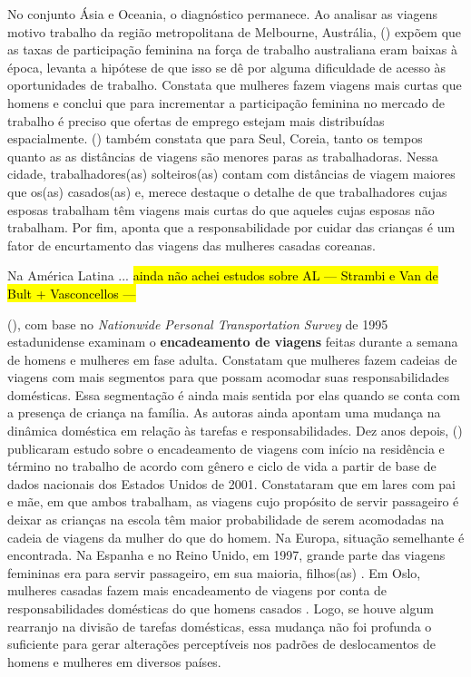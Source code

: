 No conjunto Ásia e Oceania, o diagnóstico permanece.
Ao analisar as viagens motivo trabalho da região metropolitana de Melbourne, Austrália,  (\citeyear{HOWE1982}) expõem que as taxas de participação feminina na força de trabalho australiana eram baixas à época, levanta a hipótese de que isso se dê por alguma dificuldade de acesso às oportunidades de trabalho. Constata que mulheres fazem viagens mais curtas que homens e conclui que para incrementar a participação feminina no mercado de trabalho é preciso que ofertas de emprego estejam mais distribuídas espacialmente. 
 (\citeyear{SONG2003}) também constata que para Seul, Coreia, tanto os tempos quanto as as distâncias de viagens são menores paras as trabalhadoras. Nessa cidade, trabalhadores(as) solteiros(as) contam com distâncias de viagem maiores que os(as) casados(as) e, merece destaque o detalhe de que trabalhadores cujas esposas trabalham têm viagens mais curtas do que aqueles cujas esposas não trabalham. Por fim,  aponta que a responsabilidade por cuidar das crianças é um fator de encurtamento das viagens das mulheres casadas coreanas.

Na América Latina ... \hl{ainda não achei estudos sobre AL ---  Strambi e Van de Bult
+ Vasconcellos --- }

\cite{DALMASO2009}




 (\citeyear{MCGUCKIN1995}), com base no  \emph{Nationwide Personal Transportation Survey} de 1995 estadunidense examinam o \textbf{encadeamento de viagens} feitas durante a semana de homens e mulheres em fase adulta. Constatam que mulheres fazem cadeias de viagens com mais segmentos para que possam acomodar suas responsabilidades domésticas. Essa segmentação é ainda mais sentida por elas quando se conta com a presença de criança na família. As autoras ainda apontam uma mudança na dinâmica doméstica em relação às tarefas e responsabilidades.
Dez anos depois,  (\citeyear{MCNUCKIN2005}) publicaram estudo sobre o encadeamento de viagens com início na residência e término no trabalho de acordo com gênero e ciclo de vida a partir de base de dados nacionais dos Estados Unidos de 2001. Constataram que em lares com pai e mãe, em que ambos trabalham, as viagens cujo propósito de servir passageiro é deixar as crianças na escola têm maior probabilidade de serem acomodadas na cadeia de viagens da mulher do que do homem.
Na Europa, situação semelhante é encontrada. Na Espanha e no Reino Unido, em 1997, grande parte das viagens femininas era para servir passageiro, em sua maioria, filhos(as) \cite{ROOT1999}. 
Em Oslo, mulheres casadas fazem mais encadeamento de viagens por conta de responsabilidades domésticas do que homens casados \cite{HJORTHOL2000}.
Logo, se houve algum rearranjo na divisão de tarefas domésticas, essa mudança não foi profunda o suficiente para gerar alterações perceptíveis nos padrões de deslocamentos de homens e mulheres em diversos países.


